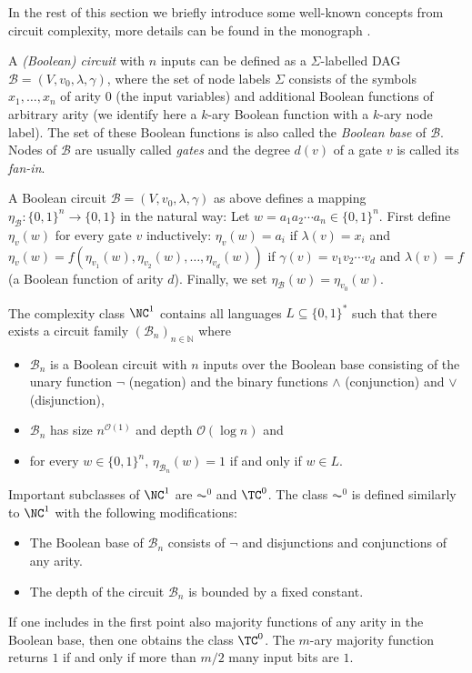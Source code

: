 \documentclass[a4paper,UKenglish,cleveref, autoref, thm-restate, numberwithinsect]{lipics-v2021}
\begin{document}
In the rest of this section we briefly introduce some well-known concepts from circuit
complexity, more details can be found in the monograph \cite{Vollmer99}.

A \emph{(Boolean) circuit}  with $n$ inputs can be defined as a $\Sigma$-labelled DAG $\mathcal{B} = (V,v_0, \lambda, \gamma)$, where the set of node labels
$\Sigma$ consists of the symbols $x_1, \ldots, x_n$ of arity $0$ (the input variables) and additional 
Boolean functions of arbitrary arity (we identify here a $k$-ary Boolean function with a $k$-ary node label).
The set of these Boolean functions is also called the \emph{Boolean base} of $\mathcal{B}$.
Nodes of $\mathcal{B}$ are usually called \emph{gates} and the degree $d(v)$ of a gate $v$ is called its \emph{fan-in}.

A Boolean circuit $\mathcal{B} = (V,v_0, \lambda, \gamma)$ as above defines a mapping $\eta_\mathcal{B} : \{0,1\}^n \to \{0,1\}$ in the natural way:
Let $w = a_1 a_2 \cdots a_n \in \{0,1\}^n$. First define $\eta_v(w)$ for every gate $v$ inductively:
$\eta_v(w)=a_i$ if $\lambda(v) = x_i$ and $\eta_v(w) = f(\eta_{v_1}(w), \eta_{v_2}(w), \ldots, \eta_{v_d}(w))$ if 
$\gamma(v) = v_1 v_2 \cdots v_d$ and $\lambda(v) = f$ (a Boolean function of arity $d$).
Finally, we set $\eta_\mathcal{B}(w) = \eta_{v_0}(w)$.

The complexity class $\NC^1$ contains all languages $L \subseteq \{0,1\}^*$ such that there exists a circuit family $(\mathcal{B}_n)_{n \in \mathbb{N}}$ where
\begin{itemize}
\item $\mathcal{B}_n$ is a Boolean circuit with $n$ inputs over the Boolean base consisting of the unary function $\neg$ (negation) and 
the binary functions $\wedge$ (conjunction) and $\vee$ (disjunction),
\item $\mathcal{B}_n$ has size $n^{\mathcal{O}(1)}$ and depth $\mathcal{O}(\log n)$ and
\item for every $w \in \{0,1\}^n$, $\eta_{\mathcal{B}_n}(w)=1$ if and only if $w \in L$.
\end{itemize}
Important subclasses of $\NC^1$ are $\AC^0$ and $\TC^0$. The class $\AC^0$ is defined similarly to $\NC^1$ with the following modifications:
\begin{itemize}
\item The Boolean base of $\mathcal{B}_n$ consists of $\neg$ and disjunctions and conjunctions of any arity.
\item The depth of the circuit $\mathcal{B}_n$ is bounded by a fixed constant.
\end{itemize}
If one includes in the first point also majority functions of any
arity in the Boolean base, then one obtains the class $\TC^0$.
The $m$-ary majority function returns $1$ if and only if more than $m/2$ many input bits are $1$.
\end{document}
